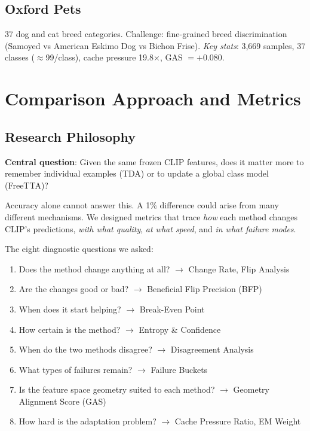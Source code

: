 \documentclass[12pt,a4paper]{article}
\newcommand{\1}{\mathbf{1}}
\begin{document}
\subsection{Oxford Pets}
37 dog and cat breed categories.
Challenge: fine-grained breed discrimination (Samoyed vs American Eskimo Dog vs Bichon Frise).
\textit{Key stats}: 3,669 samples, 37 classes ($\approx$99/class), cache pressure 19.8$\times$, GAS $=+0.080$.

\section{Comparison Approach and Metrics}

\subsection{Research Philosophy}

\textbf{Central question}: Given the same frozen CLIP features, does it matter more to remember individual examples (TDA) or to update a global class model (FreeTTA)?

Accuracy alone cannot answer this.
A 1\% difference could arise from many different mechanisms.
We designed metrics that trace \emph{how} each method changes CLIP's predictions, \emph{with what quality}, \emph{at what speed}, and \emph{in what failure modes}.

The eight diagnostic questions we asked:
\begin{enumerate}
  \item Does the method change anything at all? $\to$ Change Rate, Flip Analysis
  \item Are the changes good or bad? $\to$ Beneficial Flip Precision (BFP)
  \item When does it start helping? $\to$ Break-Even Point
  \item How certain is the method? $\to$ Entropy \& Confidence
  \item When do the two methods disagree? $\to$ Disagreement Analysis
  \item What types of failures remain? $\to$ Failure Buckets
  \item Is the feature space geometry suited to each method? $\to$ Geometry Alignment Score (GAS)
  \item How hard is the adaptation problem? $\to$ Cache Pressure Ratio, EM Weight
\end{enumerate}
\end{document}
